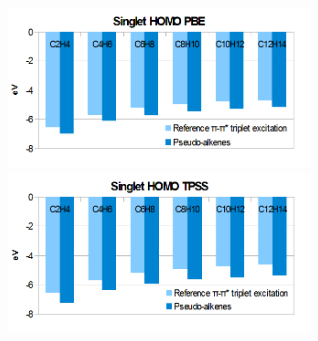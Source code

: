 \documentclass[journal=jctcce,manuscript=article]{achemso}
\begin{document}
\begin{figure}[ht]
\includegraphics[width=8cm]{pbe_homo}
\includegraphics[width=8cm]{tpss_homo}
\end{figure}
\end{document}
